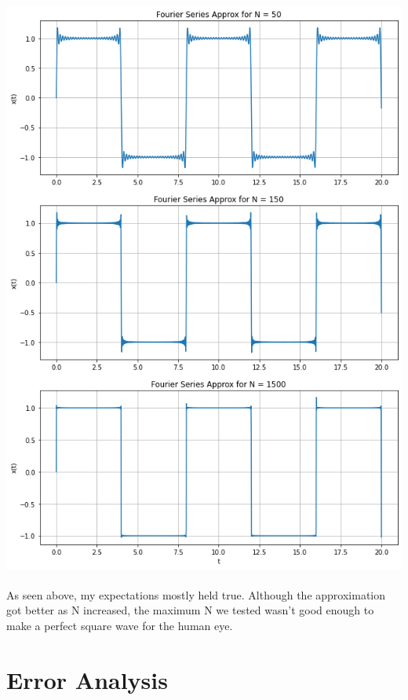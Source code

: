 \documentclass[12pt]{report}
\begin{document}
    \includegraphics[scale=0.6]{fourier2.png}
    
    \paragraph{} As seen above, my expectations mostly held true. Although the approximation got better as N increased, the maximum N we tested wasn't good enough to make a perfect square wave for the human eye.  


\section{Error Analysis}

\end{document}
